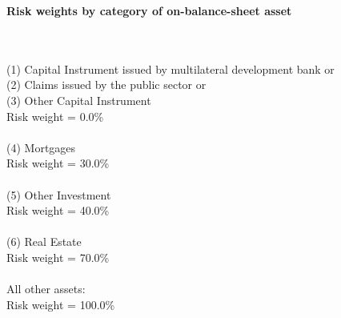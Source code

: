 \documentclass{article}
\begin{document}
\setlength{\parindent}{0em}
\begin{center}{\bf Risk weights by category of on-balance-sheet asset}\end{center}
~\\
~\\

(1) Capital Instrument issued by multilateral development bank or \\
(2) Claims issued by the public sector or \\
(3) Other Capital Instrument\\
Risk weight = 0.0\%\\

~\\
(4) Mortgages \\
Risk weight = 30.0\%\\

~\\
(5) Other Investment \\
Risk weight = 40.0\%\\

~\\
(6) Real Estate\\
Risk weight = 70.0\%\\

~\\
All other assets:\\
Risk weight = 100.0\%\\

~\\
\end{document}
